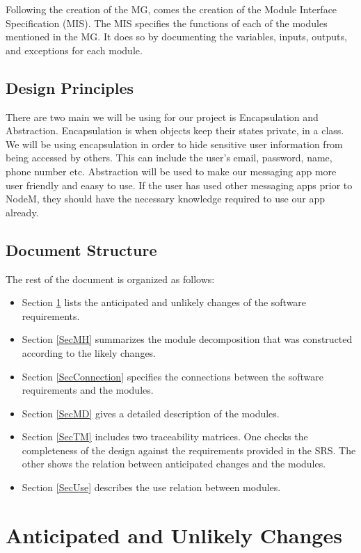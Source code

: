 \documentclass[12pt, titlepage]{article}
\begin{document}
Following the creation of the MG, comes the creation of the Module Interface Specification (MIS). The MIS specifies the functions of each of the modules mentioned in the MG. It does so by documenting the variables, inputs, outputs, and exceptions for each module. 

\subsection{Design Principles}
There are two main we will be using for our project is Encapsulation and Abstraction. Encapsulation is when objects keep their states private, in a class. We will be using encapsulation in order to hide sensitive user information from being accessed by others. This can include the user's email, password, name, phone number etc. Abstraction will be used to make our messaging app more user friendly and eaasy to use. If the user has used other messaging apps prior to NodeM, they should have the necessary knowledge required to use our app already.

\subsection{Document Structure}
The rest of the document is organized as follows: 
\begin{itemize}
\item Section \ref{SecChange} lists the anticipated and unlikely changes of the software requirements.
\item Section \ref{SecMH} summarizes the module decomposition that was constructed according to the likely changes.
\item Section \ref{SecConnection} specifies the connections between the software requirements and the modules.
\item Section \ref{SecMD} gives a detailed description of the modules.
\item Section \ref{SecTM} includes two traceability matrices. One checks the completeness of the design against the requirements provided in the SRS. The other shows the relation between anticipated changes and the modules.
\item Section \ref{SecUse} describes the use relation between modules.
\end{itemize}

\section{Anticipated and Unlikely Changes} \label{SecChange}
\end{document}
